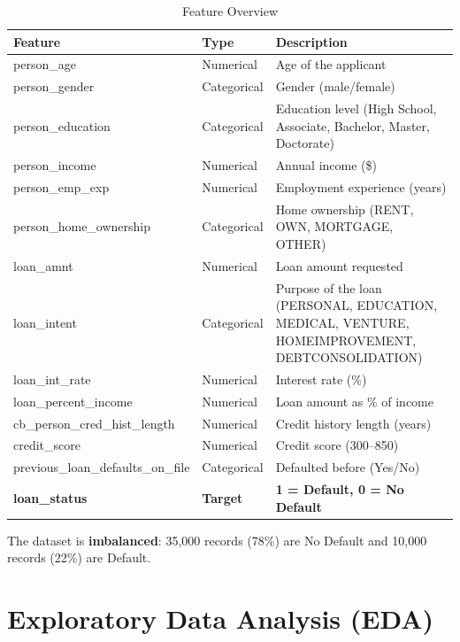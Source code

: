 \documentclass[12pt, a4paper]{article}
\begin{document}
\begin{table}[H]
  \centering
  \caption{Feature Overview}
  \begin{tabular}{l l p{7cm}}
    \toprule
    \textbf{Feature} & \textbf{Type} & \textbf{Description} \\
    \midrule
    person\_age             & Numerical   & Age of the applicant \\
    person\_gender          & Categorical & Gender (male/female) \\
    person\_education       & Categorical & Education level (High School, Associate, Bachelor, Master, Doctorate) \\
    person\_income          & Numerical   & Annual income (\$) \\
    person\_emp\_exp        & Numerical   & Employment experience (years) \\
    person\_home\_ownership & Categorical & Home ownership (RENT, OWN, MORTGAGE, OTHER) \\
    loan\_amnt              & Numerical   & Loan amount requested \\
    loan\_intent            & Categorical & Purpose of the loan (PERSONAL, EDUCATION, MEDICAL, VENTURE, HOMEIMPROVEMENT, DEBTCONSOLIDATION) \\
    loan\_int\_rate         & Numerical   & Interest rate (\%) \\
    loan\_percent\_income   & Numerical   & Loan amount as \% of income \\
    cb\_person\_cred\_hist\_length & Numerical & Credit history length (years) \\
    credit\_score           & Numerical   & Credit score (300--850) \\
    previous\_loan\_defaults\_on\_file & Categorical & Defaulted before (Yes/No) \\
    \midrule
    \textbf{loan\_status}   & \textbf{Target} & \textbf{1 = Default, 0 = No Default} \\
    \bottomrule
  \end{tabular}
\end{table}

The dataset is \textbf{imbalanced}: 35,000 records (78\%) are No Default and 10,000 records (22\%) are Default.

\section{Exploratory Data Analysis (EDA)}
\end{document}
